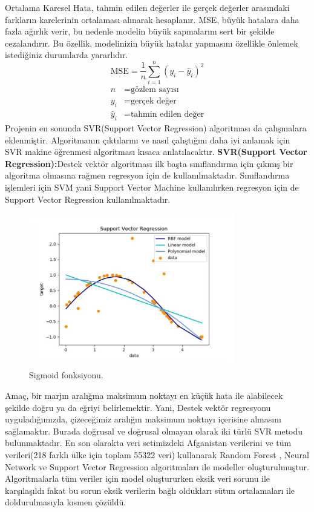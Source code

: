 \documentclass[12pt, a4paper]{article}
\begin{document}
	Ortalama Karesel Hata, tahmin edilen değerler ile gerçek değerler arasındaki farkların karelerinin ortalaması alınarak hesaplanır. MSE, büyük hatalara daha fazla ağırlık verir, bu nedenle modelin büyük sapmalarını sert bir şekilde cezalandırır. Bu özellik, modelinizin büyük hatalar yapmasını özellikle önlemek istediğiniz durumlarda yararlıdır.\cite{MSE}
	\[
	\text{MSE} = \frac{1}{n} \sum_{i=1}^{n} (y_i - \hat{y}_i)^2
	\]
	\begin{align*}
		n &= \text{gözlem sayısı} \\
		y_i &= \text{gerçek değer} \\
		\hat{y}_i &= \text{tahmin edilen değer}
	\end{align*}
	Projenin en sonunda SVR(Support Vector Regression) algoritması da çalışmalara eklenmiştir. Algoritmanın çıktılarını ve nasıl çalıştığını daha iyi anlamak için SVR makine öğrenmesi algoritması kısaca anlatılacaktır.
	\textbf{SVR(Support Vector Regression):}Destek vektör algoritması ilk başta sınıflandırma için çıkmış bir algoritma olmasına rağmen regresyon için de kullanılmaktadır. Sınıflandırma işlemleri için SVM yani Support Vector Machine kullanılırken regresyon için de Support Vector Regression kullanılmaktadır.
	\begin{figure}[!h]
		\centering
		\includegraphics[width=0.8\textwidth, height=0.3\textheight]{6.13.png}
		\caption{Sigmoid fonksiyonu.}
	\end{figure}
	\newpage
	Amaç, bir marjın aralığına maksimum noktayı en küçük hata ile alabilecek şekilde doğru ya da eğriyi belirlemektir. Yani, Destek vektör regresyonu uyguladığımızda, çizeceğimiz aralığın maksimum noktayı içerisine almasını sağlamaktır. Burada doğrusal ve doğrusal olmayan olarak iki türlü SVR metodu bulunmaktadır.\cite{svr}
	\newline
	En son olarakta veri setimizdeki Afganistan verilerini ve tüm verileri(218 farklı ülke için toplam 55322 veri) kullanarak Random Forest , Neural Network ve Support Vector Regression algoritmaları ile modeller oluşturulmuştur.
	Algoritmalarla tüm veriler için model oluştururken eksik veri sorunu ile karşılaşıldı fakat bu sorun eksik verilerin bağlı oldukları sütun ortalamaları ile doldurulmasıyla kısmen çözüldü.
	
\end{document}
